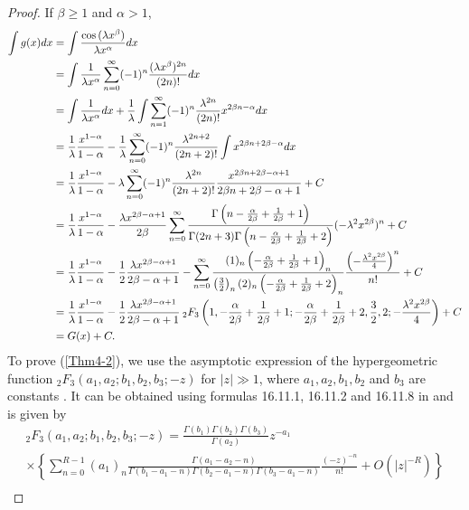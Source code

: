 \documentclass[smallextended]{svjour3}
\begin{document}
\begin{proof}
If $\beta\ge1$ and $\alpha>1$,
\begin{align}
\int g(x) dx&=\int \frac{\cos{(\lambda x^\beta)
}}{\lambda x^\alpha}dx \nonumber\\ &=\int\frac{1}{\lambda x^\alpha}\sum\limits_{n=0}^{\infty}(-1)^n\frac{(\lambda x^\beta)^{2n}}{(2n)!}dx
\nonumber\\ &=\int\frac{1}{\lambda x^\alpha}dx+\frac{1}{\lambda}\int\sum\limits_{n=1}^{\infty}(-1)^n\frac{\lambda^{2n}}{(2n)!}x^{2\beta n-\alpha}dx
\nonumber\\&=\frac{1}{\lambda}\frac{x^{1-\alpha}}{1-\alpha}-\frac{1}{\lambda}\sum\limits_{n=0}^{\infty}(-1)^n\frac{\lambda^{2n+2}}{(2n+2)!}\int x^{2\beta n+2\beta-\alpha} dx
\nonumber\\&=\frac{1}{\lambda}\frac{x^{1-\alpha}}{1-\alpha}-\lambda\sum\limits_{n=0}^{\infty}(-1)^n\frac{\lambda^{2n}}{(2n+2)!}\frac{x^{2\beta n+2\beta-\alpha+1}}{2\beta n+2\beta-\alpha+1}+C
\nonumber\\&=\frac{1}{\lambda}\frac{x^{1-\alpha}}{1-\alpha}-\frac{\lambda x^{2\beta-\alpha+1}}{2\beta}\sum\limits_{n=0}^{\infty}
\frac{\Gamma\left(n-\frac{\alpha}{2\beta}+\frac{1}{2\beta}+1\right)}{\Gamma(2n+3)\Gamma\left(n-\frac{\alpha}{2\beta}+\frac{1}{2\beta}+2\right)}(-\lambda^2 x^{2\beta})^{n}+C
\nonumber\\&=\frac{1}{\lambda}\frac{x^{1-\alpha}}{1-\alpha}-\frac{1}{2}\frac{\lambda x^{2\beta-\alpha+1}}{2\beta-\alpha+1}-\sum\limits_{n=0}^{\infty}\frac{(1)_n\left(-\frac{\alpha}{2\beta}+\frac{1}{2\beta}+1\right)_n}{\left(\frac{3}{2}\right)_n (2)_n\left(-\frac{\alpha}{2\beta}+\frac{1}{2\beta}+2\right)_n}\frac{\left(-\frac{\lambda^2 x^{2\beta}}{4}\right)^{n}}{n!}+C
\nonumber\\&=\frac{1}{\lambda}\frac{x^{1-\alpha}}{1-\alpha}-\frac{1}{2}\frac{\lambda x^{2\beta-\alpha+1}}{2\beta-\alpha+1}\hspace{.075cm} _{2}F_{3}\left(1,-\frac{\alpha}{2\beta}+\frac{1}{2\beta}+1;-\frac{\alpha}{2\beta}+\frac{1}{2\beta}+2,\frac{3}{2},2;-\frac{\lambda^2 x^{2\beta}}{4}\right)+C
\nonumber\\&=G(x)+C.
\end{align}
To prove (\ref{Thm4-2}), we use the asymptotic expression of the hypergeometric function ${}_2F_3\left(a_1,a_2;b_1,b_2,b_3;-z\right)$ for $|z|\gg 1$, where $a_1,a_2,b_1,b_2$ and $b_3$ are constants . It can be obtained using formulas 16.11.1, 16.11.2 and 16.11.8 in \cite{ND} and is given by
\begin{eqnarray}
{}_2F_3\left(a_1,a_2;b_1,b_2,b_3;-z\right)= \frac{\Gamma(b_1)\Gamma(b_2)\Gamma(b_3)}{\Gamma(a_2)}z^{-a_1}\hspace{5cm}\nonumber\\\times \left\{\sum\limits_{n=0}^{R-1}(a_1)_n\frac{\Gamma(a_1-a_2-n) }{\Gamma(b_1-a_1-n)\Gamma(b_2-a_1-n)\Gamma(b_3-a_1-n)}\frac{(-z)^{-n}}{n!}+O(|z|^{-R})\right\}\nonumber\\

\end{eqnarray}
\end{proof}
\end{document}
